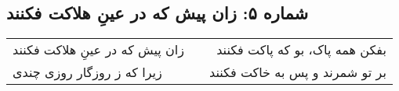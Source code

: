 \begin{center}
\section*{شماره ۵: زان پیش که در عینِ هلاکت فکنند}
\label{sec:005}
\begin{longtable}{l p{0.5cm} r}
زان پیش که در عینِ هلاکت فکنند
&&
بفکن همه پاک، بو که پاکت فکنند
\\
زیرا که ز روزگار روزی چندی
&&
بر تو شمرند و پس به خاکت فکنند
\\
\end{longtable}
\end{center}
